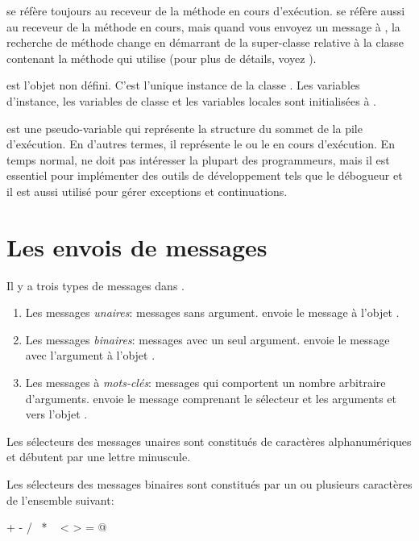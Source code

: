 \documentclass[a4paper,10pt,twoside]{book}
\begin{document}
 se réfère toujours au receveur de la méthode en cours d'exécution.
 se réfère aussi au receveur de la méthode en
cours, mais quand vous envoyez un message à \super, la recherche
de méthode change en démarrant de la super-classe relative à la classe contenant la méthode qui utilise 
(pour plus de détails, voyez ).

 est l'objet non défini.
C'est l'unique instance de la classe . 
Les variables d'instance, les variables de classe et les variables locales  sont initialisées à .

 est une pseudo-variable qui représente la structure du sommet de la pile d'exécution.
En d'autres termes, il représente le  ou le  en cours d'exécution.
En temps normal,  ne doit pas intéresser la plupart
des programmeurs, mais il est essentiel pour implémenter des
outils de développement tels que le débogueur et il est aussi utilisé pour gérer exceptions et continuations.

\section{Les envois de messages}

Il y a trois types de messages dans \pharo.
\begin{enumerate}
  \item Les messages \emph{unaires}: messages sans argument.
   envoie le message   à l'objet .
  \item Les messages \emph{binaires}: messages avec un seul argument.
  	 envoie le message \ct{+} avec l'argument  à l'objet .
  \item Les messages à \emph{mots-clés}: messages qui comportent un nombre arbitraire d'arguments.
  	 envoie le message comprenant le sélecteur 	 et les arguments  et  vers l'objet .
\end{enumerate}

Les sélecteurs des messages unaires sont constitués de caractères alphanumériques et débutent par une lettre minuscule. 

Les sélecteurs des messages binaires sont constitués par un ou plusieurs caractères de l'ensemble suivant:
\begin{code}{}
+ - / \ * ~ < > = @ %
\end{code}
\noindent
\end{document}
